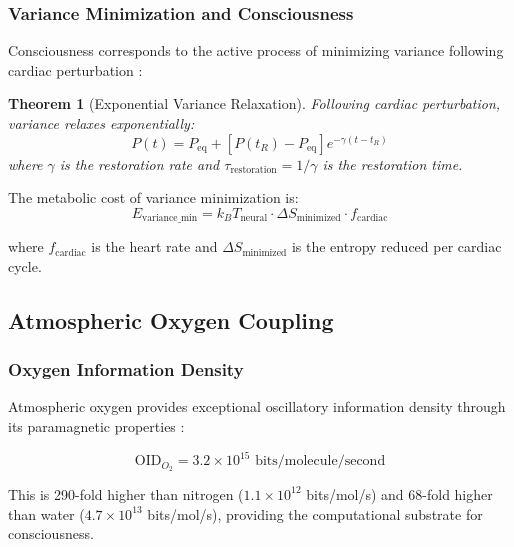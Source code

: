\documentclass[12pt]{article}
\newtheorem{theorem}{Theorem}[section]
\theoremstyle{remark}
\begin{document}
\subsubsection{Variance Minimization and Consciousness}

Consciousness corresponds to the active process of minimizing variance following cardiac perturbation \citep{bennett1987demons}:

\begin{theorem}[Exponential Variance Relaxation]
Following cardiac perturbation, variance relaxes exponentially:
\begin{equation}
P(t) = P_{\text{eq}} + [P(t_R) - P_{\text{eq}}] e^{-\gamma(t - t_R)}
\end{equation}
where $\gamma$ is the restoration rate and $\tau_{\text{restoration}} = 1/\gamma$ is the restoration time.
\end{theorem}

The metabolic cost of variance minimization is:
\begin{equation}
E_{\text{variance\_min}} = k_B T_{\text{neural}} \cdot \Delta S_{\text{minimized}} \cdot f_{\text{cardiac}}
\end{equation}

where $f_{\text{cardiac}}$ is the heart rate and $\Delta S_{\text{minimized}}$ is the entropy reduced per cardiac cycle.

\subsection{Atmospheric Oxygen Coupling}

\subsubsection{Oxygen Information Density}

Atmospheric oxygen provides exceptional oscillatory information density through its paramagnetic properties \citep{sachikonye2024atmospheric}:

\begin{equation}
\text{OID}_{O_2} = 3.2 \times 10^{15} \text{ bits/molecule/second}
\end{equation}

This is 290-fold higher than nitrogen ($1.1 \times 10^{12}$ bits/mol/s) and 68-fold higher than water ($4.7 \times 10^{13}$ bits/mol/s), providing the computational substrate for consciousness.
\end{document}
